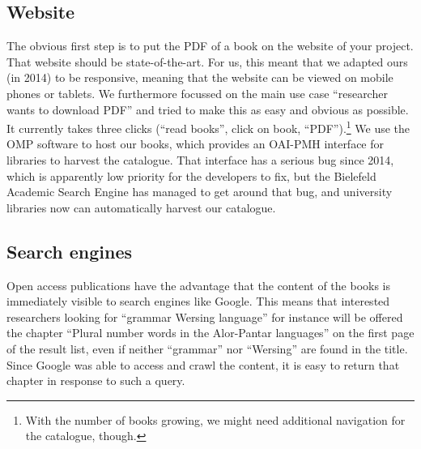 \documentclass[nonflat,modfonts,output=book] {langsci/langscibook}
\begin{document}
\subsection{Website}
The obvious first step is to put the PDF of a book on the website of your project. That website should be state-of-the-art. For us, this meant that we adapted ours (in 2014) to be responsive, meaning that the website can be viewed on mobile phones or tablets. We furthermore focussed on the main use case ``researcher wants to download PDF'' and tried to make this as easy and obvious as possible. It currently takes three clicks (``read books'', click on book, ``PDF'').\footnote{With the number of books growing, we might need additional navigation for the catalogue, though.} We use the OMP software to host our books, which provides an OAI-PMH interface for libraries to harvest the catalogue. That interface has a serious bug since 2014, which is apparently low priority for the developers to fix, but the Bielefeld Academic Search Engine has managed to get around that bug, and university libraries now can automatically harvest our catalogue.

\subsection{Search engines}
Open access publications have the advantage that the content of the books is immediately visible to search engines like Google. This means that interested researchers looking for ``grammar Wersing language'' for instance will be offered the chapter ``Plural number words in the Alor-Pantar languages'' on the first page of the result list, even if neither ``grammar'' nor ``Wersing'' are found in the title. Since Google was able to access and crawl the content, it is easy to return that chapter in response to such a query. 
\end{document}
